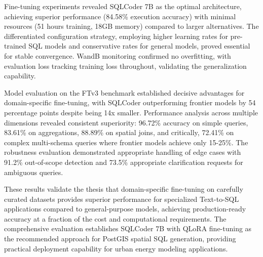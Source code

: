 Fine-tuning experiments revealed SQLCoder 7B as the optimal architecture, achieving superior performance (84.58\% execution accuracy) with minimal resources (51 hours training, 18GB memory) compared to larger alternatives. The differentiated configuration strategy, employing higher learning rates for pre-trained SQL models and conservative rates for general models, proved essential for stable convergence. WandB monitoring confirmed no overfitting, with evaluation loss tracking training loss throughout, validating the generalization capability.

Model evaluation on the FTv3 benchmark established decisive advantages for domain-specific fine-tuning, with SQLCoder outperforming frontier models by 54 percentage points despite being 14x smaller. Performance analysis across multiple dimensions revealed consistent superiority: 96.72\% accuracy on simple queries, 83.61\% on aggregations, 88.89\% on spatial joins, and critically, 72.41\% on complex multi-schema queries where frontier models achieve only 15-25\%. The robustness evaluation demonstrated appropriate handling of edge cases with 91.2\% out-of-scope detection and 73.5\% appropriate clarification requests for ambiguous queries.

These results validate the thesis that domain-specific fine-tuning on carefully curated datasets provides superior performance for specialized Text-to-SQL applications compared to general-purpose models, achieving production-ready accuracy at a fraction of the cost and computational requirements. The comprehensive evaluation establishes SQLCoder 7B with QLoRA fine-tuning as the recommended approach for PostGIS spatial SQL generation, providing practical deployment capability for urban energy modeling applications.

